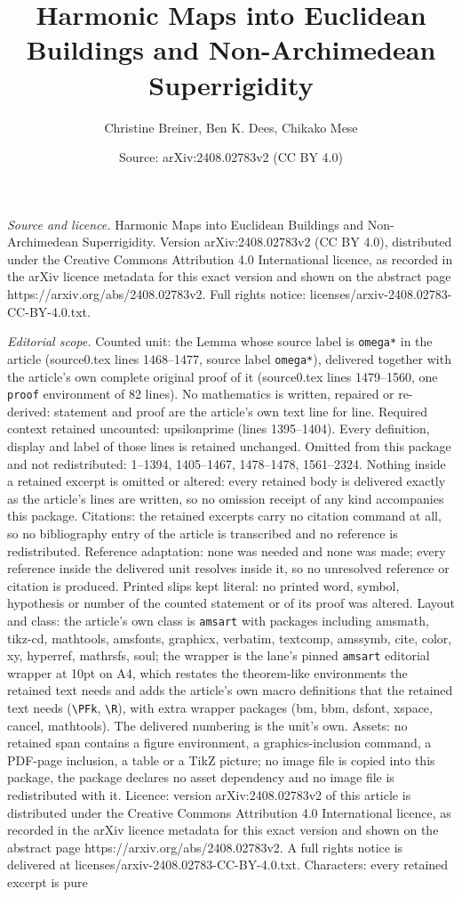 \documentclass[10pt,a4paper]{amsart}
\title[Harmonic Maps into Euclidean Buildings and Non-Archimedean S]{Harmonic Maps into Euclidean Buildings and Non-Archimedean Superrigidity}
\author{Christine Breiner, Ben K. Dees, Chikako Mese}
\date{Source: arXiv:2408.02783v2 (CC BY 4.0)}
\begin{document}
\maketitle

\noindent\emph{Source and licence.} Harmonic Maps into Euclidean Buildings and Non-Archimedean Superrigidity. Version arXiv:2408.02783v2 (CC BY 4.0), distributed under the Creative Commons Attribution 4.0 International licence, as recorded in the arXiv licence metadata for this exact version and shown on the abstract page https://arxiv.org/abs/2408.02783v2. Full rights notice: licenses/arxiv-2408.02783-CC-BY-4.0.txt.\par\smallskip

\noindent\textit{Editorial scope.} Counted unit: the Lemma whose source label is \texttt{omega*} in the article (source0.tex lines 1468--1477, source label \texttt{omega*}), delivered together with the article's own complete original proof of it (source0.tex lines 1479--1560, one \texttt{proof} environment of 82 lines). No mathematics is written, repaired or re-derived: statement and proof are the article's own text line for line. Required context retained uncounted: upsilonprime (lines 1395--1404). Every definition, display and label of those lines is retained unchanged. Omitted from this package and not redistributed: 1--1394, 1405--1467, 1478--1478, 1561--2324. Nothing inside a retained excerpt is omitted or altered: every retained body is delivered exactly as the article's lines are written, so no omission receipt of any kind accompanies this package. Citations: the retained excerpts carry no citation command at all, so no bibliography entry of the article is transcribed and no reference is redistributed. Reference adaptation: none was needed and none was made; every reference inside the delivered unit resolves inside it, so no unresolved reference or citation is produced. Printed slips kept literal: no printed word, symbol, hypothesis or number of the counted statement or of its proof was altered. Layout and class: the article's own class is \texttt{amsart} with packages including amsmath, tikz-cd, mathtools, amsfonts, graphicx, verbatim, textcomp, amssymb, cite, color, xy, hyperref, mathrsfs, soul; the wrapper is the lane's pinned \texttt{amsart} editorial wrapper at 10pt on A4, which restates the theorem-like environments the retained text needs and adds the article's own macro definitions that the retained text needs (\texttt{\textbackslash PFk}, \texttt{\textbackslash R}), with extra wrapper packages (bm, bbm, dsfont, xspace, cancel, mathtools). The delivered numbering is the unit's own. Assets: no retained span contains a figure environment, a graphics-inclusion command, a PDF-page inclusion, a table or a TikZ picture; no image file is copied into this package, the package declares no asset dependency and no image file is redistributed with it. Licence: version arXiv:2408.02783v2 of this article is distributed under the Creative Commons Attribution 4.0 International licence, as recorded in the arXiv licence metadata for this exact version and shown on the abstract page https://arxiv.org/abs/2408.02783v2. A full rights notice is delivered at licenses/arxiv-2408.02783-CC-BY-4.0.txt. Characters: every retained excerpt is pure 
\end{document}

